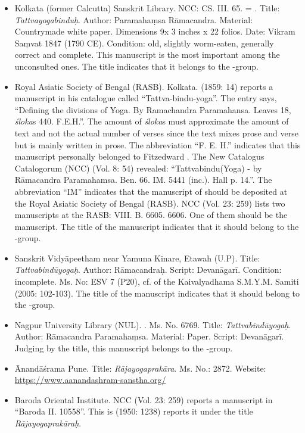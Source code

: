 \begin{itemize}
\item Kolkata (former Calcutta) Sanskrit Library. NCC: CS. III. 65. = . Title: \emph{Tattvayogabinduḥ}. Author: Paramahaṃsa Rāmacandra. Material: Countrymade white paper. Dimensions 9x 3 inches x 22 folios. Date: Vikram Saṃvat 1847 (1790 CE). Condition: old, slightly worm-eaten, generally correct and complete. This manuscript is the most important among the unconsulted ones. The title indicates that it belongs to the \alpha-group. 
\item Royal Asiatic Society of Bengal (RASB). Kolkata. \nocite{newcataloguscatalogorum8} \nocite{newcataloguscatalogorum23} \citeauthor{hall1859} (1859: 14) reports a manuscript  in his catalogue called ``Tattva-bindu-yoga''. The entry says, ``Defining the divisions of Yoga. By Ramachandra Paramahansa. Leaves 18, \textit{śloka}s 440. F.E.H.''. The amount of \textit{śloka}s must approximate the amount of text and not the actual number of verses since the text mixes prose and verse but is mainly written in prose. The abbreviation ``F. E. H.'' indicates that this manuscript personally belonged to Fitzedward \citeauthor{hall1859}. The New Catalogus Catalogorum (NCC) (Vol. 8: 54) revealed: ``Tattvabindu(Yoga) - by Rāmacandra Paramahamsa. Ben. 66. IM. 5441 (inc.). Hall p. 14.''. The abbreviation ``IM'' indicates that the manuscript of \citeauthor{hall1859} should be deposited at the Royal Asiatic Society of Bengal (RASB). NCC (Vol. 23: 259) lists two manuscripts at the RASB: VIII. B. 6605. 6606. One of them should be the \citeauthor{hall1859} manuscript. The title of the manuscript indicates that it should belong to the \beta-group. 
\item Sanskrit Vidyāpeetham near Yamuna Kinare, Etawah (U.P). Title: \textit{Tattvabindūyogaḥ}. Author: Rāmacandraḥ. Script: Devanāgarī. Condition: incomplete. Ms. No: ESV 7 (P20), cf.  of the Kaivalyadhama S.M.Y.M. Samiti (2005: 102-103). The title of the manuscript indicates that it should belong to the \beta-group. 
\item  Nagpur University Library (NUL). . Ms. No. 6769. Title: \emph{Tattvabindūyogaḥ}. Author: Rāmacandra Paramahaṃsa. Material: Paper. Script: Devanāgarī. Judging by the title, this manuscript belongs to the \beta-group. 
\item Ānandāśrama Pune. Title: \emph{Rājayogaprakāra}. Ms. No.: 2872. Website: \url{https://www.aanandashram-sanstha.org/}
\item Baroda Oriental Institute. NCC (Vol. 23: 259) reports a manuscript in ``Baroda II. 10558''. This is  (1950: 1238) reports it under the title \textit{Rājayogaprakāraḥ}. %
\end{itemize}
  
